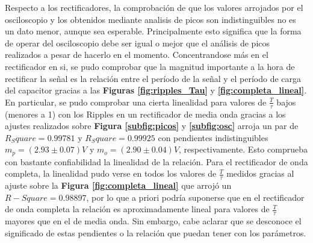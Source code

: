 \documentclass[11pt,a4paper]{article}
\begin{document}
Respecto a los rectificadores, la comprobación de que los valores arrojados por el osciloscopio y los obtenidos mediante analisis de picos son indistinguibles no es un dato menor, aunque sea esperable. Principalmente esto significa que
la forma de operar del osciloscopio debe ser igual o mejor que el análisis de picos realizados a pesar de hacerlo en el momento. Concentrandose más en el rectificador en si, se pudo comprobar que la magnitud importante a la hora de
rectificar la señal es la relación entre el período de la señal y el período de carga del capacitor gracias a las \textbf{Figuras \ref{fig:ripples_Tau}} y \textbf{\ref{fig:completa_lineal}}. En particular, se pudo comprobar una cierta
linealidad para valores de $\frac{T}{\tau}$ bajos (menores a 1) con los Ripples en un rectificador de media onda gracias a los ajustes realizados sobre \textbf{Figura \ref{subfig:picos}} y \textbf{\ref{subfig:osc}} arroja un par de 
$R_Square = 0.99781$ y $R_Square = 0.99925$ con pendientes indistinguibles $m_p = (2.93 \pm 0.07)V$ y $m_o = (2.90 \pm 0.04)V$, respectivamente. Esto comprueba con bastante confiabilidad la linealidad de la relación. Para el rectificador
de onda completa, la linealidad pudo verse en todos los valores de $\frac{T}{\tau}$ medidos gracias al ajuste sobre la \textbf{Figura \ref{fig:completa_lineal}} que arrojó un $R-Square = 0.98897$, por lo que a priori podría suponerse que en
el rectificador de onda completa la relación es aproximadamente lineal para valores de $\frac{T}{\tau}$ mayores que en el de media onda. Sin embargo, cabe aclarar que se desconoce el significado de estas pendientes o la relación que
puedan tener con los parámetros.
\label{sec:conclusiones}








 
\end{document}
